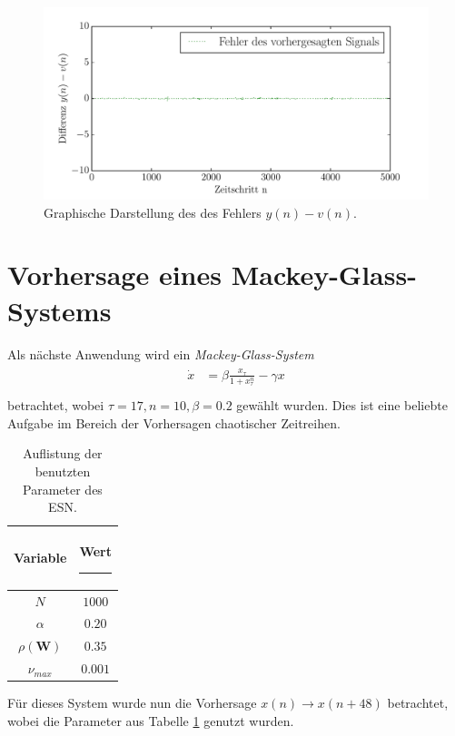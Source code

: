 \begin{figure}[H]
    \centering
    \includegraphics[width = 0.9 \textwidth]{figures/roessler_cross_err.pdf}
    \caption{Graphische Darstellung des des Fehlers $y(n)-v(n)$.}
    \label{fig:application_roessler_b2}
\end{figure}

\section{Vorhersage eines Mackey-Glass-Systems}
Als nächste Anwendung wird ein \textit{Mackey-Glass-System}
\begin{align}
\label{eq:application_roessler_pde}
\begin{split}
\dot{x} &= \beta \frac{x_\tau}{1+x_\tau^n}-\gamma x\\
\end{split}
\end{align}
betrachtet, wobei $\tau = 17, n=10, \beta = 0.2$ gewählt wurden. Dies ist eine beliebte Aufgabe im Bereich der Vorhersagen chaotischer Zeitreihen.

\begin{table}[H]
	\centering
		\begin{tabular}{|c|c|}
		\rule[-1ex]{0pt}{4.5ex} Variable & \hspace{4ex} Wert \rule[-1ex]{4ex}{0pt}\\ 
		\hline \hline 
		\rule[-1ex]{0pt}{4.5ex} $N$ & $1000$ \\ 
		\hline 
		\rule[-1ex]{0pt}{4.5ex} $\alpha$ & $0.20$ \\ 
		\hline 
		\rule[-1ex]{0pt}{4.5ex} $\rho(\mathbf{W})$ & $0.35$ \\ 
		\hline 
		\rule[-1ex]{0pt}{4.5ex} $\nu_{max}$ & $0.001$ \\ 
		\hline 
	\end{tabular} 
	\caption{Auflistung der benutzten Parameter des \textsc{ESN}.}
\label{tab:application_mackeyglass}
\end{table}

Für dieses System wurde nun die Vorhersage $x(n) \rightarrow x(n+48)$ betrachtet, wobei die Parameter aus Tabelle \ref{tab:application_mackeyglass} genutzt wurden.